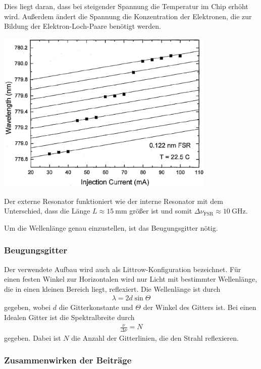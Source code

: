 \documentclass[captions=tableheading]{scrartcl}
\begin{document}
Dies liegt daran, dass bei steigender Spannung die Temperatur im Chip erhöht wird. Außerdem ändert die Spannung die Konzentration der Elektronen, die zur Bildung der Elektron-Loch-Paare benötigt werden.   
\begin{center}
	\includegraphics[width=10.5cm]{images/spannung.png}
	\label{fig:spannung}
\end{center}
Der externe Resonator funktioniert wie der interne Resonator mit dem Unterschied, dass die Länge $L\approx\SI{15}{\milli\meter}$ größer ist und somit $\Delta \nu_{\text{FSR}} \approx \SI{10}{\giga\hertz}$. 

Um die Wellenlänge genau einzustellen, ist das Beugungsgitter nötig.
\newpage
\subsubsection{Beugungsgitter}
 Der verwendete Aufbau wird auch als Littrow-Konfiguration bezeichnet. 
 Für einen festen Winkel zur Horizontalen wird nur Licht mit bestimmter Wellenlänge, die in einen kleinen Bereich liegt, reflexiert. 
 Die Wellenlänge ist durch 
\begin{align*}
\lambda=2d\sin\Theta 
\end{align*}  
 gegeben, wobei $d$ die Gitterkonstante und $\Theta$ der Winkel des Gitters ist.
 Bei einen Idealen Gitter ist die Spektralbreite durch
 \begin{align*}
 \frac{\nu}{\Delta \nu}=N
\end{align*}  
gegeben. Dabei ist $N$ die Anzahl der Gitterlinien, die den Strahl reflexieren.
\subsubsection{Zusammenwirken der Beiträge}
\end{document}
